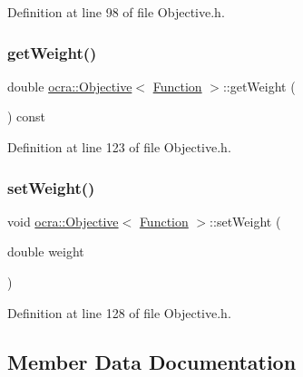 Definition at line 98 of file Objective.\+h.

\hypertarget{classocra_1_1Objective_3_01Function_01_4_ac952056842fb2d15b758eb5a0b342a30}{}\label{classocra_1_1Objective_3_01Function_01_4_ac952056842fb2d15b758eb5a0b342a30} 
\subsubsection{\texorpdfstring{get\+Weight()}{getWeight()}}
{\footnotesize\ttfamily double \hyperlink{classocra_1_1Objective}{ocra\+::\+Objective}$<$ \hyperlink{classocra_1_1Function}{Function} $>$\+::get\+Weight (\begin{DoxyParamCaption}{ }\end{DoxyParamCaption}) const\hspace{0.3cm}{\ttfamily [inline]}}



Definition at line 123 of file Objective.\+h.

\hypertarget{classocra_1_1Objective_3_01Function_01_4_a41fa85e1e535bb935f20312e7b398a26}{}\label{classocra_1_1Objective_3_01Function_01_4_a41fa85e1e535bb935f20312e7b398a26} 
\subsubsection{\texorpdfstring{set\+Weight()}{setWeight()}}
{\footnotesize\ttfamily void \hyperlink{classocra_1_1Objective}{ocra\+::\+Objective}$<$ \hyperlink{classocra_1_1Function}{Function} $>$\+::set\+Weight (\begin{DoxyParamCaption}\item[{double}]{weight }\end{DoxyParamCaption})\hspace{0.3cm}{\ttfamily [inline]}}



Definition at line 128 of file Objective.\+h.



\subsection{Member Data Documentation}
\hypertarget{classocra_1_1Objective_3_01Function_01_4_a68d84f4b46839664695f62c12ed8092d}{}\label{classocra_1_1Objective_3_01Function_01_4_a68d84f4b46839664695f62c12ed8092d} 
